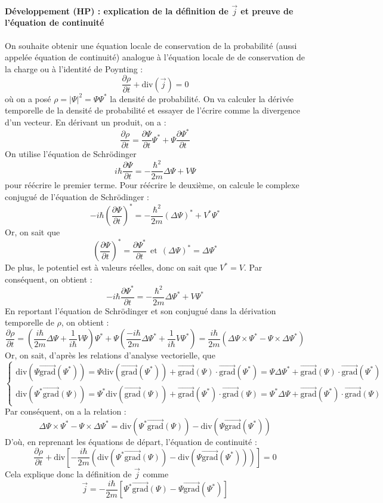 \documentclass[french]{book}
\theoremstyle{plain}
\theoremstyle{definition}
\theoremstyle{remark}
\newcommand{\st}{^*}
\newcommand{\grad}{\overrightarrow{\text{grad}}}
\renewcommand{\div}{\text{div}}
\begin{document}
\paragraph{Développement (HP) : explication de la définition de $\overrightarrow{j}$ et preuve de l'équation de continuité} On souhaite obtenir une équation locale de conservation de la probabilité (aussi appelée équation de continuité) analogue à l'équation locale de de conservation de la charge ou à l'identité de Poynting : $$\frac{\partial \rho}{\partial t}+\div\left(\overrightarrow{j}\right)=0$$ où on a posé $\rho=\lvert\Psi\rvert^2=\Psi\Psi\st$ la densité de probabilité. On va calculer la dérivée temporelle de la densité de probabilité et essayer de l'écrire comme la divergence d'un vecteur. En dérivant un produit, on a : $$\frac{\partial \rho}{\partial t}=\frac{\partial \Psi}{\partial t}\Psi\st+\Psi\frac{\partial\Psi\st}{\partial t}$$ On utilise l'équation de Schrödinger $$i\hbar\frac{\partial\Psi}{\partial t}=-\frac{\hbar^2}{2m}\Delta\Psi+V\Psi$$ pour réécrire le premier terme. Pour réécrire le deuxième, on calcule le complexe conjugué de l'équation de Schrödinger : $$-i\hbar\left(\frac{\partial \Psi}{\partial t}\right)\st=-\frac{\hbar^2}{2m}\left(\Delta\Psi\right)\st+V\st\Psi\st$$
Or, on sait que $$\left(\frac{\partial\Psi}{\partial t}\right)\st=\frac{\partial\Psi\st}{\partial t} \ \ \text{et} \ \ \left(\Delta\Psi\right)\st=\Delta\Psi\st$$ De plus, le potentiel est à valeurs réelles, donc on sait que $V\st=V$. Par conséquent, on obtient : $$-i\hbar\frac{\partial\Psi\st}{\partial t}=-\frac{\hbar^2}{2m}\Delta\Psi\st+V\Psi\st$$ En reportant l'équation de Schrödinger et son conjugué dans la dérivation temporelle de $\rho$, on obtient : $$\frac{\partial\rho}{\partial t}=\left(\frac{i\hbar}{2m}\Delta\Psi+\frac{1}{i\hbar}V\Psi\right)\Psi\st+\Psi\left(\frac{-i\hbar}{2m}\Delta\Psi\st+\frac{1}{i\hbar}V\Psi\st\right)=\frac{i\hbar}{2m}\left(\Delta\Psi \times\Psi\st-\Psi\times\Delta\Psi\st\right)$$
Or, on sait, d'après les relations d'analyse vectorielle, que $$\begin{cases}
	\div\left(\Psi\grad(\Psi\st)\right)=\Psi\div\left(\grad(\Psi\st)\right)+\grad(\Psi)\cdot\grad(\Psi\st)=\Psi\Delta\Psi\st+\grad(\Psi)\cdot\grad(\Psi\st) \\
	\div\left(\Psi\st\grad(\Psi)\right)=\Psi\st\div\left(\grad(\Psi)\right)+\grad(\Psi\st)\cdot\grad(\Psi) =\Psi\st\Delta\Psi+\grad(\Psi\st)\cdot\grad(\Psi)
\end{cases}$$ Par conséquent, on a la relation : $$\Delta\Psi \times\Psi\st-\Psi\times\Delta\Psi\st =\div\left(\Psi\st\grad(\Psi)\right)-\div\left(\Psi\grad(\Psi\st)\right)$$ D'où, en reprenant les équations de départ, l'équation de continuité : $$\frac{\partial\rho}{\partial t}+\div\left[-\frac{i\hbar}{2m}\left(\div\left(\Psi\st\grad(\Psi)\right)-\div\left(\Psi\grad(\Psi\st)\right)\right)\right]=0$$ Cela explique donc la définition de $\overrightarrow{j}$ comme $$\overrightarrow{j}=-\frac{i\hbar}{2m}\left[\Psi\st\grad(\Psi)-\Psi\grad(\Psi\st)\right]$$
\end{document}

